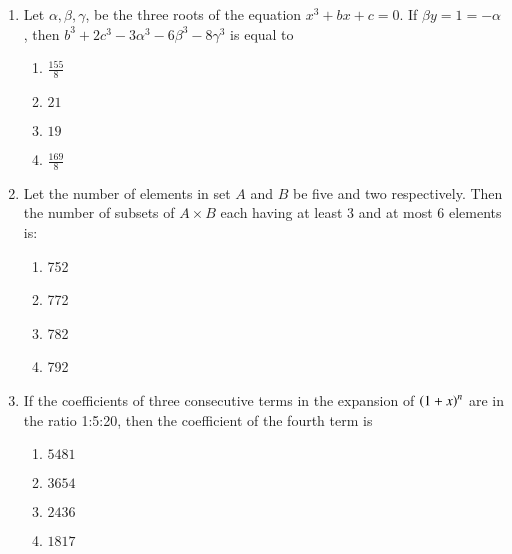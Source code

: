\documentclass[journal]{IEEEtran}
\begin{document}
\begin{enumerate}
{\begin{align*}
4x+3y&=69\\
4y-3x&=17\\
x+7y&=61
\end{align*}
Then $\brak{\alpha-\beta}^2+\alpha+\beta$ is equal to
\begin{multicols}{4}
\begin{enumerate}
\item 18
\item 15
\item 16
\item 17
\end{enumerate}
\end{multicols}
}
\item{
Let $\alpha,\beta,\gamma$, be the three roots of the equation $x^3+bx+c=0$. If $\beta y=1=-\alpha$, then $b^3+2c^3-3\alpha^3-6\beta^3-8\gamma^3$ is equal to
\begin{multicols}{4}
\begin{enumerate}
\item $\frac{155}{8}$
\item $21$
\item $19$
\item $\frac{169}{8}$
\end{enumerate}
\end{multicols}
}
\item{
Let the number of elements in set $A$ and $B$ be five and two respectively. Then the number of subsets of $A\times B$ each having at least 3 and at most 6 elements is:
\begin{multicols}{4}
\begin{enumerate}
\item 752
\item 772
\item 782
\item 792
\end{enumerate}
\end{multicols}
}
\item{
If the coefficients of three consecutive terms in the expansion of $\left(1+x\right)^n$ are in the ratio 1:5:20, then the coefficient of the fourth term is 
\begin{multicols}{4}
\begin{enumerate}
\item $5481$
\item $3654$
\item $2436$
\item $1817$
\end{enumerate}
\end{multicols}

}
\end{enumerate}
\end{document}
